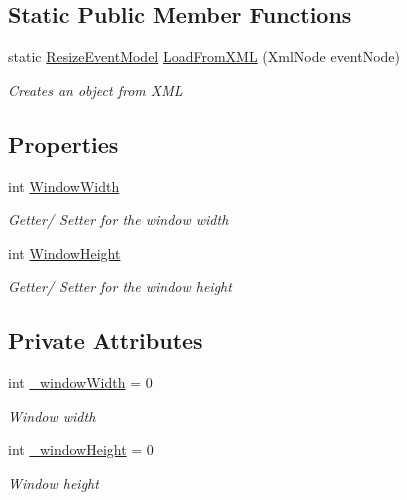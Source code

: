 \subsection*{Static Public Member Functions}
\begin{DoxyCompactItemize}
\item 
static \hyperlink{class_web_analyzer_1_1_models_1_1_event_model_1_1_resize_event_model}{Resize\+Event\+Model} \hyperlink{class_web_analyzer_1_1_models_1_1_event_model_1_1_resize_event_model_a85d357e36f33991ea33642934eb98463}{Load\+From\+X\+M\+L} (Xml\+Node event\+Node)
\begin{DoxyCompactList}\small\item\em Creates an object from X\+M\+L \end{DoxyCompactList}\end{DoxyCompactItemize}
\subsection*{Properties}
\begin{DoxyCompactItemize}
\item 
int \hyperlink{class_web_analyzer_1_1_models_1_1_event_model_1_1_resize_event_model_a4af3fc44a8ef02d431323fc2bce6c2e6}{Window\+Width}
\begin{DoxyCompactList}\small\item\em Getter/ Setter for the window width \end{DoxyCompactList}\item 
int \hyperlink{class_web_analyzer_1_1_models_1_1_event_model_1_1_resize_event_model_ad65a672d91446cf683d40bbe83cd6c0b}{Window\+Height}
\begin{DoxyCompactList}\small\item\em Getter/ Setter for the window height \end{DoxyCompactList}\end{DoxyCompactItemize}
\subsection*{Private Attributes}
\begin{DoxyCompactItemize}
\item 
int \hyperlink{class_web_analyzer_1_1_models_1_1_event_model_1_1_resize_event_model_a57e07c8f4dfe09d8ad8213760600e260}{\+\_\+window\+Width} = 0
\begin{DoxyCompactList}\small\item\em Window width \end{DoxyCompactList}\item 
int \hyperlink{class_web_analyzer_1_1_models_1_1_event_model_1_1_resize_event_model_ac7bc177aeb68fc0033b9d6f9061afc46}{\+\_\+window\+Height} = 0
\begin{DoxyCompactList}\small\item\em Window height \end{DoxyCompactList}\end{DoxyCompactItemize}
